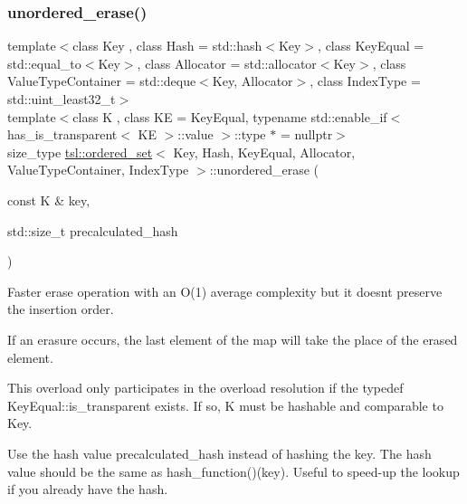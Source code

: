 \subsubsection{\texorpdfstring{unordered\_erase()}{unordered\_erase()}\hspace{0.1cm}{\footnotesize\ttfamily [6/6]}}
{\footnotesize\ttfamily template$<$class Key , class Hash  = std\+::hash$<$\+Key$>$, class Key\+Equal  = std\+::equal\+\_\+to$<$\+Key$>$, class Allocator  = std\+::allocator$<$\+Key$>$, class Value\+Type\+Container  = std\+::deque$<$\+Key, Allocator$>$, class Index\+Type  = std\+::uint\+\_\+least32\+\_\+t$>$ \\
template$<$class K , class KE  = Key\+Equal, typename std\+::enable\+\_\+if$<$ has\+\_\+is\+\_\+transparent$<$ K\+E $>$\+::value $>$\+::type $\ast$  = nullptr$>$ \\
size\+\_\+type \mbox{\hyperlink{classtsl_1_1ordered__set}{tsl\+::ordered\+\_\+set}}$<$ Key, Hash, Key\+Equal, Allocator, Value\+Type\+Container, Index\+Type $>$\+::unordered\+\_\+erase (\begin{DoxyParamCaption}\item[{const K \&}]{key,  }\item[{std\+::size\+\_\+t}]{precalculated\+\_\+hash }\end{DoxyParamCaption})\hspace{0.3cm}{\ttfamily [inline]}}





Faster erase operation with an O(1) average complexity but it doesn\textquotesingle{}t preserve the insertion order.

If an erasure occurs, the last element of the map will take the place of the erased element.

This overload only participates in the overload resolution if the typedef Key\+Equal\+::is\+\_\+transparent exists. If so, K must be hashable and comparable to Key.

Use the hash value \textquotesingle{}precalculated\+\_\+hash\textquotesingle{} instead of hashing the key. The hash value should be the same as hash\+\_\+function()(key). Useful to speed-\/up the lookup if you already have the hash. \mbox{\label{classtsl_1_1ordered__set_a1bc951514a5c4c29c14b6cf5177cf1ec}} 
